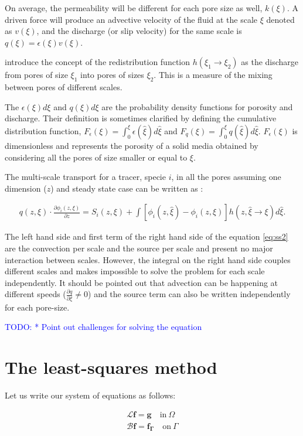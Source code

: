 \documentclass{CFD2011}
\newcommand{\TODO}[1]{\textcolor{blue}{TODO: #1} \\}
\begin{document}
On average, the permeability will be different for each pore size as well, $k(\xi)$. A driven force will produce an advective velocity of the fluid at the scale $\xi$ denoted as $v(\xi)$, and the discharge (or slip velocity) for the same scale is $q(\xi)=\epsilon(\xi) v(\xi)$.

\cite{DupuySchwarz} introduce the concept of the redistribution function $h(\xi_1 \rightarrow \xi_2)$ as the discharge from pores of size $\xi_1$ into pores of sizes $\xi_2$. This is a measure of the mixing between pores of different scales.

The $\epsilon(\xi)d\xi$ and $q(\xi)d\xi$ are the probability density functions for porosity and discharge. Their definition is sometimes clarified by defining the cumulative distribution function, $F_{\epsilon}(\xi)=\int_0^{\xi}\epsilon(\hat \xi)d\hat\xi$ and $F_{q}(\xi)=\int_0^{\xi}q(\hat\xi)d\hat\xi$. $F_{\epsilon}(\xi)$ is dimensionless and represents the porosity of a solid media obtained by considering all the pores of size smaller or equal to $\xi$.

The multi-scale transport for a tracer, specie $i$, in all the pores assuming one dimension ($z$) and steady state case can be written as \citep{DupuySchwarz}:

\begin{align}
q(z, \xi) \cdot \frac{\partial \phi_{i}(z, \xi)}{\partial z}  = 
 S_{i}(z, \xi) + \int [\phi_{i}(z, \hat \xi) - \phi_{i}(z, \xi)] h(z, \hat \xi \rightarrow \xi) d\hat \xi . 
\label{eq:ss2}
\end{align}

The left hand side and first term of the right hand side of the equation \ref{eq:ss2} are the convection per scale and the source per scale and present no major interaction between scales. However, the integral on the right hand side couples different scales and makes impossible to solve the problem for each scale independently. It should be pointed out that advection can be happening at different speeds ($\tfrac{\partial q}{\partial \xi} \neq 0$) and the source term can also be written independently for each pore-size.

\TODO{    * Point out challenges for solving the equation}

\section{The least-squares method}
Let us write our system of equations as follows:

\begin{eqnarray}
\mathcal{L} \mathbf{f} = \mathbf{g} \quad \mbox{in} \ \Omega \label{eq:Problem} \\
\mathcal{B} \mathbf{f} = \mathbf{f_\Gamma} \quad \mbox{on} \ \Gamma \label{eq:Boundary}
\end{eqnarray}
\end{document}

